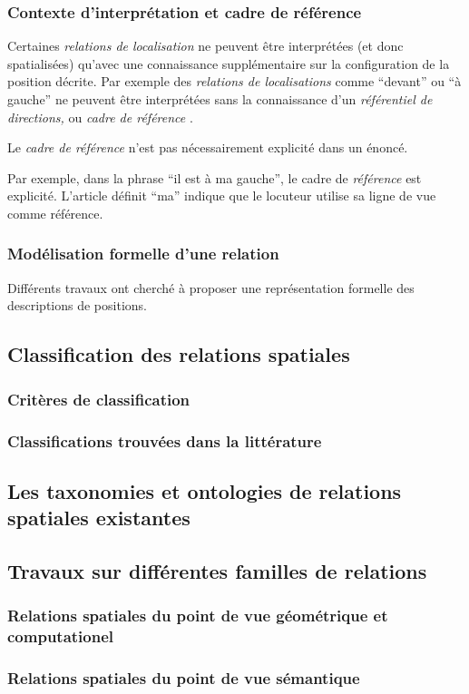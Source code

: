 \subsubsection{Contexte d'interprétation et cadre de référence}

Certaines \emph{relations de localisation} ne peuvent être
interprétées (et donc spatialisées) qu'avec une connaissance
supplémentaire sur la configuration de la position décrite. Par
exemple des \emph{relations de localisations} comme \enquote{devant}
ou \enquote{à gauche} ne peuvent être interprétées sans la
connaissance d'un \emph{référentiel de directions,} ou \emph{cadre de
  référence} \autocite{Duchene2019}.

Le \emph{cadre de référence} n'est pas nécessairement explicité dans
un énoncé.

Par exemple, dans la phrase \enquote{il est à ma gauche}, le cadre de
\emph{référence} est explicité. L'article définit \enquote{ma} indique
que le locuteur utilise sa ligne de vue comme référence.

\subsubsection{Modélisation formelle d'une relation}

Différents travaux ont cherché à proposer une représentation formelle
des descriptions de positions.

\autocite{Bateman2010}

\autocite{Pustejovsky2017}

\subsection{Classification des relations spatiales}

\subsubsection{Critères de classification}

\subsubsection{Classifications trouvées dans la littérature}

\subsection{Les taxonomies et ontologies de relations spatiales
  existantes}

\subsection{Travaux sur différentes familles de relations}

\subsubsection{Relations spatiales du point de vue géométrique et
  computationel}

\subsubsection{Relations spatiales du point de vue sémantique}

